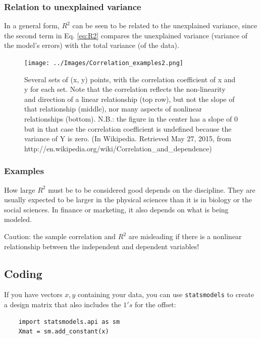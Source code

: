 \subsubsection{Relation to unexplained variance}

In a general form, $R^2$ can be seen to be related to the unexplained variance, since the second term in Eq. \ref{eq:R2} compares the unexplained variance (variance of the model's errors) with the total variance (of the data).

\begin{figure}
  \centering
  \texttt{[image: ../Images/Correlation\_examples2.png]}\\
  \caption{Several sets of (x, y) points, with the correlation coefficient of x and y for each set. Note that the correlation reflects the non-linearity and direction of a linear relationship (top row), but not the slope of that relationship (middle), nor many aspects of nonlinear relationships (bottom). N.B.: the figure in the center has a slope of 0 but in that case the correlation coefficient is undefined because the variance of Y is zero. (In Wikipedia. Retrieved May 27, 2015, from http://en.wikipedia.org/wiki/Correlation\_and\_dependence)}\label{fig:correlation}
\end{figure}

\subsubsection{Examples}

How large $R^2$ must be to be considered good depends on the discipline. They are usually expected to be larger in the physical sciences than it is in biology or the social sciences. In finance or marketing, it also depends on what is being modeled.

Caution: the sample correlation and $R^2$ are misleading if there is a nonlinear relationship between the independent and dependent variables!


\subsection{Coding}

If you have vectors $x,y$ containing your data, you can use \texttt{statsmodels} to create a design matrix that also includes the $1's$ for the offset:

\begin{lstlisting}
    import statsmodels.api as sm
    Xmat = sm.add_constant(x)
\end{lstlisting}

